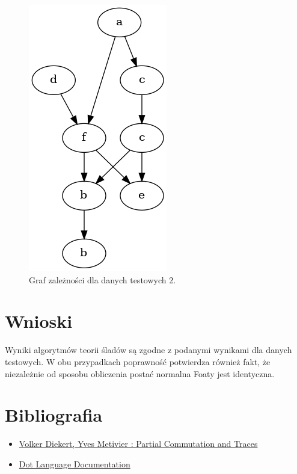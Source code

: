\documentclass[11pt]{article}
\begin{document}
\begin{figure}[H]
\centering
\includegraphics[width=0.25\linewidth]{graph2.png}
\caption{\label{}Graf zależności dla danych testowych 2.}
\end{figure}
\section*{Wnioski}
\label{sec:orgf73a188}
Wyniki algorytmów teorii śladów są zgodne z podanymi wynikami dla danych testowych.
W obu przypadkach poprawność potwierdza również fakt, że niezależnie od sposobu
obliczenia postać normalna Foaty jest identyczna.
\section*{Bibliografia}
\label{sec:org260dfb0}
\begin{itemize}
\item \href{https://www.researchgate.net/publication/280851316\_Partial\_Commutation\_and\_Traces}{Volker Diekert, Yves Metivier : Partial Commutation and Traces}
\item \href{https://graphviz.org/doc/info/lang.html}{Dot Language Documentation}
\end{itemize}
\end{document}
